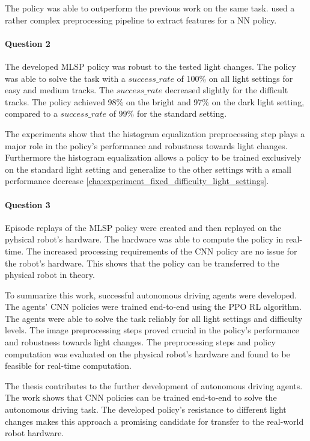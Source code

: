 The policy was able to outperform the previous work on the same task. \textcite{maximilian} used a rather complex preprocessing pipeline to extract features for a \acs{NN} policy.

\paragraph{Question 2}
The developed \acs{MLSP} policy was robust to the tested light changes. The policy was able to solve the task with a $success\_rate$ of 100\% on all light settings for easy and medium tracks. The $success\_rate$ decreased slightly for the difficult tracks. The policy achieved 98\% on the bright and 97\% on the dark light setting, compared to a $success\_rate$ of 99\% for the standard setting.

The experiments show that the histogram equalization preprocessing step plays a major role in the policy's performance and robustness towards light changes. Furthermore the histogram equalization allows a policy to be trained exclusively on the standard light setting and generalize to the other settings with a small performance decrease \ref{cha:experiment_fixed_difficulty_light_settings}.

\paragraph{Question 3}
Episode replays of the \acs{MLSP} policy were created and then replayed on the pyhsical robot's hardware. The hardware was able to compute the policy in real-time. The increased processing requirements of the \acs{CNN} policy are no issue for the robot's hardware. This shows that the policy can be transferred to the physical robot in theory.



To summarize this work, successful autonomous driving agents were developed. The agents' \acs{CNN} policies were trained end-to-end using the \acs{PPO} \acs{RL} algorithm. The agents were able to solve the task reliably for all light settings and difficulty levels. The image preprocessing steps proved crucial in the policy's performance and robustness towards light changes. The preprocessing steps and policy computation was evaluated on the physical robot's hardware and found to be feasible for real-time computation.

The thesis contributes to the further development of autonomous driving agents. The work shows that \acs{CNN} policies can be trained end-to-end to solve the autonomous driving task. The developed policy's resistance to different light changes makes this approach a promising candidate for transfer to the real-world robot hardware.


